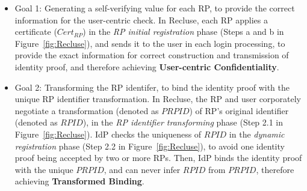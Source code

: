 \begin{itemize}
 \item Goal 1: Generating a self-verifying value for each RP, to provide the correct information for the user-centric check.
  In Recluse, each RP applies a certificate ($Cert_{RP}$) in the \emph{RP initial registration} phase (Steps a and b in Figure~\ref{fig:Recluse}),
  and sends it to the user in each login processing,
  to provide the exact information for  correct construction and transmission of identity proof,
             and therefore achieving \textbf{User-centric Confidentiality}.




    \item Goal 2: Transforming the RP identifer, to bind the identity proof with the unique RP identifier transformation.
  In Recluse, the RP and user corporately negotiate a transformation (denoted as $PRPID$) of RP's original identifier (denoted as $RPID$), in the \emph{RP identifier transforming} phase (Step 2.1 in Figure~\ref{fig:Recluse}).
  IdP checks the uniqueness of $RPID$ in the \emph{dynamic registration} phase (Step 2.2 in Figure~\ref{fig:Recluse}),  to avoid one identity proof being accepted by two or more RPs.
  Then, IdP  binds the identity proof with the unique $PRPID$, and  can never infer $RPID$ from $PRPID$,
   therefore achieving \textbf{Transformed Binding}.


\end{itemize}
